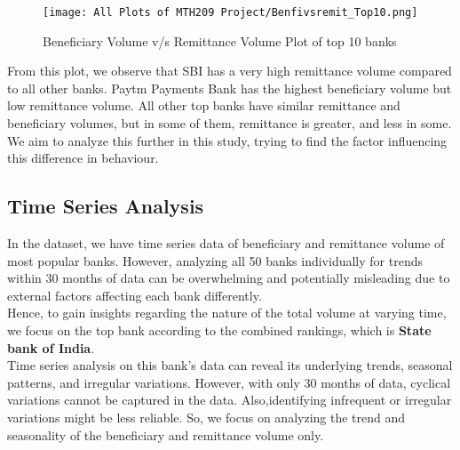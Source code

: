 \documentclass{article}
\begin{document}
\begin{figure}[H]
    \centering
    \texttt{[image: All Plots of MTH209 Project/Benfivsremit\_Top10.png]}
    \caption{Beneficiary Volume v/s Remittance Volume Plot of top 10 banks}
    \label{fig:example}
\end{figure}

From this plot, we observe that SBI has a very high remittance volume compared to all other banks. Paytm Payments Bank has the highest beneficiary volume but low remittance volume. All other top banks have similar remittance and beneficiary volumes, but in some of them, remittance is greater, and less in some. We aim to analyze this further in this study, trying to find the factor influencing this difference in behaviour.
\newpage
\subsection{Time Series Analysis}

In the dataset, we have time series data of beneficiary and remittance volume of most popular banks. However, analyzing all 50 banks individually for trends within 30 months of data can be overwhelming and potentially misleading due to external factors affecting each bank differently. \\
Hence, to gain insights regarding the nature of the total volume at varying time, we focus on the top bank according to the combined rankings, which is \textbf{State bank of India}.\\ Time series analysis on this bank's data can reveal its underlying trends, seasonal patterns, and irregular variations. However, with only 30 months of data, cyclical variations cannot be captured in the data. Also,identifying infrequent or irregular variations might be less reliable. So, we focus on analyzing the trend and seasonality of the beneficiary and remittance volume only.\\
\end{document}
